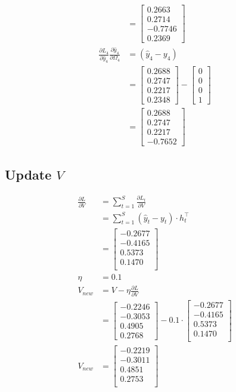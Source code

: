 \documentclass{article}
\begin{document}
\begin{align*}
&= \begin{bmatrix} 0.2663 \\ 0.2714 \\ -0.7746 \\ 0.2369 \end{bmatrix}\\
\frac{\partial L_4}{\partial \hat{y}_4}\frac{\partial \hat{y}_4}{\partial \Omega_4} &= (\hat{y}_{4}-y_{4})\\
&=\begin{bmatrix} 0.2688 \\ 0.2747 \\ 0.2217 \\ 0.2348 \end{bmatrix}-\begin{bmatrix} 0 \\ 0 \\ 0 \\ 1 \end{bmatrix} \\
&= \begin{bmatrix} 0.2688 \\ 0.2747 \\ 0.2217 \\ -0.7652 \end{bmatrix}
\end{align*}
\subsection{Update $V$}
\begin{align*} 
\frac{\partial L}{\partial V} &= \sum_{t=1}^{S} \frac{\partial L_{t}}{\partial V} \\
&=\sum_{t=1}^{S} (\hat{y}_{t} - y_{t}) \cdot h_{t}^\top\\
&= \begin{bmatrix}
-0.2677 \\
-0.4165 \\
0.5373 \\
0.1470 \\
\end{bmatrix}\\
\eta &= 0.1\\
V_{new} &= V - \eta \frac{\partial L}{\partial V}\\
 &= \begin{bmatrix}
    -0.2246 \\
    -0.3053 \\
    0.4905 \\
    0.2768
\end{bmatrix} - 0.1 \cdot\begin{bmatrix}
-0.2677 \\
-0.4165 \\
0.5373 \\
0.1470 \\
\end{bmatrix} \\
V_{new} &= \begin{bmatrix}
-0.2219 \\
-0.3011 \\
0.4851 \\
0.2753 \\
\end{bmatrix}
\end{align*}
\end{document}

